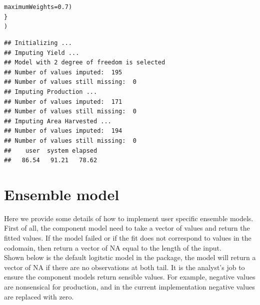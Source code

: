 \documentclass[nojss]{jss}\usepackage[]{graphicx}\usepackage[]{color}
\makeatletter
\newcommand{\hlnum}[1]{\textcolor[rgb]{0.686,0.059,0.569}{#1}}%
\newcommand{\hlstd}[1]{\textcolor[rgb]{0.345,0.345,0.345}{#1}}%
\newcommand{\hlkwc}[1]{\textcolor[rgb]{0.333,0.667,0.333}{#1}}%
\newenvironment{kframe}{%
 \def\at@end@of@kframe{}%
 \ifinner\ifhmode%
  \def\at@end@of@kframe{\end{minipage}}%
  \begin{minipage}{\columnwidth}%
 \fi\fi%
 \def\FrameCommand##1{\hskip\@totalleftmargin \hskip-\fboxsep
 \colorbox{shadecolor}{##1}\hskip-\fboxsep
     \hskip-\linewidth \hskip-\@totalleftmargin \hskip\columnwidth}%
 \MakeFramed {\advance\hsize-\width
   \@totalleftmargin\z@ \linewidth\hsize
   \@setminipage}}%
 {\par\unskip\endMakeFramed%
 \at@end@of@kframe}
\newenvironment{knitrout}{}{} %
\makeatother
\begin{document}
\begin{knitrout}
\begin{kframe}
\begin{alltt}
                                   \hlkwc{maximumWeights} \hlstd{=} \hlnum{0.7}\hlstd{)}
    \hlstd{\}}
    \hlstd{)}
\end{alltt}
\begin{verbatim}
## Initializing ... 
## Imputing Yield ...
## Model with 2 degree of freedom is selected
## Number of values imputed:  195 
## Number of values still missing:  0 
## Imputing Production ...
## Number of values imputed:  171 
## Number of values still missing:  0 
## Imputing Area Harvested ...
## Number of values imputed:  194 
## Number of values still missing:  0
##    user  system elapsed 
##   86.54   91.21   78.62
\end{verbatim}
\end{kframe}
\end{knitrout}




\section{Ensemble model}
Here we provide some details of how to implement user specific
ensemble models.\\

First of all, the component model need to take a vector of values and
return the fitted values. If the model failed or if the fit does not
correspond to values in the codomain, then return a vector of NA equal
to the length of the input.\\

Shown below is the default logitstic model in the package, the model
will return a vector of NA if there are no observations at both
tail. It is the analyst's job to ensure the component models return
sensible values. For example, negative values are nonsensical for
production, and in the current implementation negative values are
replaced with zero.
\end{document}
